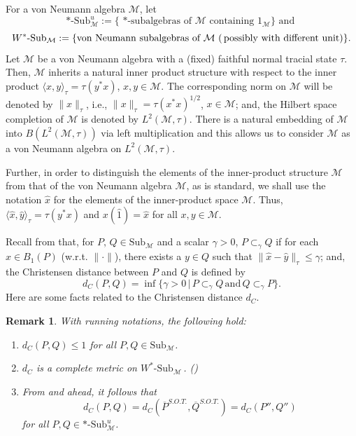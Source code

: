 \documentclass{amsart}
\numberwithin{equation}{section}
\newcommand{\1}{\mathbf{1}}
\newcommand{\mM}{\mathcal{M}}
\newtheorem{remark}[theorem]{Remark}
\begin{document}
For a von Neumann algebra $\mM$, let
\[
*\text{-Sub}^u_{\mM} :=\{ \text{ *-subalgebras of } \mM \text{ containing } 1_{\mM}\} \text{ and }
\]
\[
W^*\text{-}\mathrm{Sub}_{\mM} :=\{ \text{von Neumann subalgebras of }
\mM\ \text{(\,possibly with different unit)}\}.
\]
  Let $\mM$ be a von Neumann
 algebra with a (fixed) faithful normal tracial state $\tau$. Then,
 $\mM$ inherits a natural inner product structure with respect to the
 inner product $\langle x, y \rangle_{\tau} = \tau(y^*x)$, $x, y \in
 \mM$. The corresponding norm on $\mM$ will be denoted by $\|x\|_{\tau}$,
 i.e., $\|x\|_{\tau} = \tau(x^*x)^{1/2}$, $x \in \mM$; and, the Hilbert
 space completion of $\mM$ is denoted by $L^2(\mM, \tau)$.  There is a
 natural embedding of $\mM$ into $B(L^2(\mM, \tau))$ via left
 multiplication and this allows us to consider $\mM$ as a von Neumann
 algebra on $L^2(\mM, \tau)$.


 Further, in order to distinguish the elements of the inner-product
 structure $\mM$ from that of the von Neumann algebra $\mM$, as is
 standard, we shall use the notation $\widehat{x}$ for the elements of the
 inner-product space $\mM$. Thus, $\langle \widehat{x}, \widehat{y} \rangle_\tau
 = \tau(y^* x)$ and $x(\widehat{1}) = \widehat{x}$ for all $x, y \in \mM$.
  
    Recall from \cite{Ch1} that, for $P,\, Q \in \mathrm{Sub}_{\mM}$
    and a scalar $\gamma > 0$, $P \subset_{\gamma} Q$ if for each $x
    \in B_1(P)$ (w.r.t. $\|\cdot\|$), there exists a $ y \in Q$ such
    that $\|\widehat{x}-\widehat{y}\|_{\tau} \leq \gamma$; and, the Christensen distance
    between $P$ and $Q$ is defined by
    \begin{equation}\label{d-tau}
    d_C(P,Q) = \inf\{\gamma > 0 \, |\, P \subset_{\gamma}
    Q\, \text{and}\, Q \subset_{\gamma} P\}.
    \end{equation}  
    Here are some facts related to the Christensen distance $d_C$. 
    \begin{remark}
      With running notations, the following hold:
      \begin{enumerate}
      \item $d_C(P, Q) \leq 1$ for all $P, Q\in \mathrm{Sub}_{\mM}$.
      \item $d_C $ is a complete metric on
  $W^*\text{-}\mathrm{Sub}_{\mM}\,$. (\cite[Theorem, 5.1]{Ch1})


      \item From  and  ahead, it  follows that
          \[
          d_C(P, Q) = d_C(\overline{P}^{S.O.T.},
          \overline{Q}^{S.O.T.}) = d_C(P'', Q'')
          \]
                    for all $P, Q \in *\text{-}\mathrm{Sub}_{\mM}^u$.
      \end{enumerate}
      \end{remark}
\end{document}
